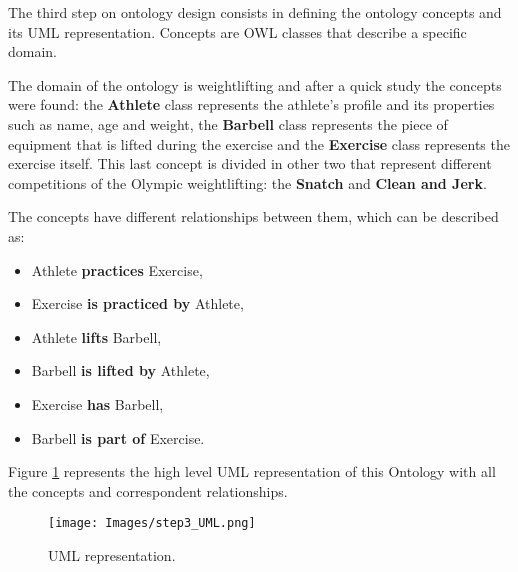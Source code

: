 The third step on ontology design consists in defining the ontology concepts and its UML representation. Concepts are OWL classes that describe a specific domain.

The domain of the ontology is weightlifting and after a quick study the concepts were found: the \textbf{Athlete} class represents the athlete's profile and its properties such as name, age and weight, the \textbf{Barbell} class represents the piece of equipment that is lifted during the exercise and the \textbf{Exercise} class represents the exercise itself. This last concept is divided in other two that represent different competitions of the Olympic weightlifting: the \textbf{Snatch} and \textbf{Clean and Jerk}.

The concepts have different relationships between them, which can be described as:
\begin{itemize}
	\item Athlete \textbf{practices} Exercise, 
	\item Exercise \textbf{is practiced by} Athlete,
	\item Athlete \textbf{lifts} Barbell,
	\item Barbell \textbf{is lifted by} Athlete,
	\item Exercise \textbf{has} Barbell,
	\item Barbell \textbf{is part of} Exercise.
\end{itemize}

Figure \ref{UML} represents the high level UML representation of this Ontology with all the concepts and correspondent relationships. 

\begin{figure}[H]
	\texttt{[image: Images/step3\_UML.png]}
	\caption{UML representation.}
	\label{UML}
\end{figure}


